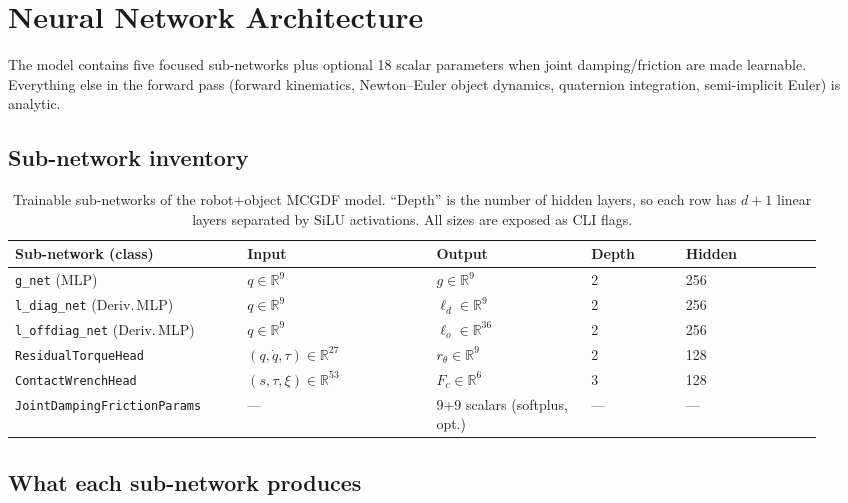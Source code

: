 \documentclass[11pt]{article}
\begin{document}
\section{Neural Network Architecture}
\label{sec:architecture}

The model contains five focused sub-networks plus optional 18 scalar
parameters when joint damping/friction are made learnable. Everything else
in the forward pass (forward kinematics, Newton--Euler object dynamics,
quaternion integration, semi-implicit Euler) is analytic.

\subsection{Sub-network inventory}

\begin{table}[h]
\centering
\small
\begin{tabular}{p{0.27\linewidth} p{0.22\linewidth} p{0.18\linewidth} p{0.11\linewidth} p{0.16\linewidth}}
\toprule
Sub-network (class)              & Input                                  & Output                       & Depth & Hidden \\
\midrule
\texttt{g\_net} (MLP)            & $q \in \mathbb{R}^9$                  & $g \in \mathbb{R}^9$         & 2     & 256    \\
\texttt{l\_diag\_net} (Deriv.\,MLP) & $q \in \mathbb{R}^9$              & $\ell_d \in \mathbb{R}^9$    & 2     & 256    \\
\texttt{l\_offdiag\_net} (Deriv.\,MLP) & $q \in \mathbb{R}^9$           & $\ell_o \in \mathbb{R}^{36}$ & 2     & 256    \\
\texttt{ResidualTorqueHead}      & $(q,\dot q,\tau) \in \mathbb{R}^{27}$ & $r_\theta \in \mathbb{R}^9$  & 2     & 128    \\
\texttt{ContactWrenchHead}       & $(s,\tau,\xi) \in \mathbb{R}^{53}$    & $F_c \in \mathbb{R}^6$       & 3     & 128    \\
\texttt{JointDampingFrictionParams} & ---                                & 9+9 scalars (softplus, opt.) & --- & ---    \\
\bottomrule
\end{tabular}
\caption{Trainable sub-networks of the robot+object MCGDF model.
``Depth'' is the number of hidden layers, so each row has $d+1$ linear
layers separated by SiLU activations. All sizes are exposed as CLI flags.}
\label{tab:subnets}
\end{table}

\subsection{What each sub-network produces}
\end{document}
